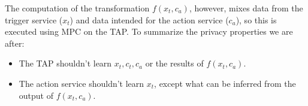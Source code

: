 The computation of the transformation $f(x_t, c_a)$, however, mixes data from
the trigger service ($x_t$) and data intended for the action service ($c_a$), so
this is executed using MPC on the TAP. To summarize the privacy properties we
are after:
\begin{itemize}
  \item The TAP shouldn't learn $x_t, c_t, c_a$ or the results of $f(x_t, c_a)$.
  \item The action service shouldn't learn $x_t$, except what can be inferred
    from the output of $f(x_t, c_a)$.
\end{itemize}
